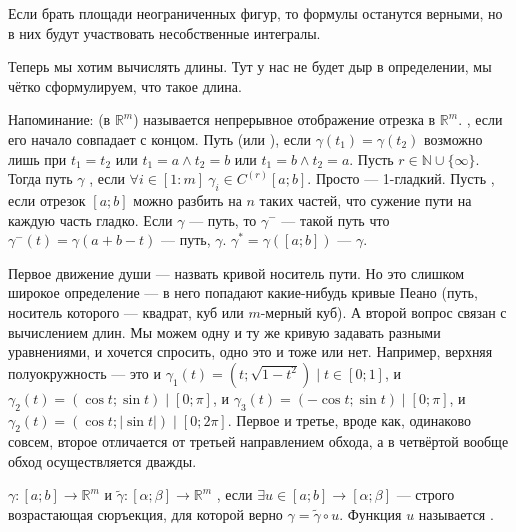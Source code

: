 \documentclass{article}
\begin{document}
\begin{itemize}
\begin{Example}
        \end{Example}
        \begin{Comment}
            Если брать площади неограниченных фигур, то формулы останутся верными, но в них будут участвовать несобственные интегралы.
        \end{Comment}
        \begin{Comment}
            Теперь мы хотим вычислять длины. Тут у нас не будет дыр в определении, мы чётко сформулируем, что такое длина.
        \end{Comment}
        \dfn Напоминание:  (в $\mathbb R^m$) называется непрерывное отображение отрезка в $\mathbb R^m$.
        \dfn {}, если его начало совпадает с концом.
        \dfn Путь  (или ), если $\gamma(t_1)=\gamma(t_2)$ возможно лишь при $t_1=t_2$ или $t_1=a\land t_2=b$ или $t_1=b\land t_2=a$.
        \dfn Пусть $r\in\mathbb N\cup\{\infty\}$. Тогда путь $\gamma$ , если $\forall i\in[1:m]~\gamma_i\in C^{(r)}[a;b]$. Просто  --- 1-гладкий.
        \dfn Пусть , если отрезок $[a;b]$ можно разбить на $n$ таких частей, что сужение пути на каждую часть гладко.
        \dfn Если $\gamma$ --- путь, то $\gamma^-$ --- такой путь что $\gamma^-(t)=\gamma(a+b-t)$ --- путь,  $\gamma$.
        \dfn $\gamma^*=\gamma([a;b])$ ---  $\gamma$.
        \begin{Comment}
            Первое движение души --- назвать кривой носитель пути. Но это слишком широкое определение --- в него попадают какие-нибудь кривые Пеано (путь, носитель которого --- квадрат, куб или $m$-мерный куб). А второй вопрос связан с вычислением длин. Мы можем одну и ту же кривую задавать разными уравнениями, и хочется спросить, одно это и тоже или нет. Например, верхняя полуокружность --- это и $\gamma_1(t)=(t;\sqrt{1-t^2})\mid t\in[0;1]$, и $\gamma_2(t)=(\cos t;\sin t)\mid[0;\pi]$, и $\gamma_3(t)=(-\cos t;\sin t)\mid[0;\pi]$, и $\gamma_2(t)=(\cos t;|\sin t|)\mid[0;2\pi]$. Первое и третье, вроде как, одинаково совсем, второе отличается от третьей направлением обхода, а в четвёртой вообще обход осуществляется дважды.
        \end{Comment}
        \dfn {} $\gamma\colon[a;b]\to\mathbb R^m$ и $\tilde\gamma\colon[\alpha;\beta]\to\mathbb R^m$ , если $\exists u\in[a;b]\to[\alpha;\beta]$ --- строго возрастающая сюръекция, для которой верно $\gamma=\tilde\gamma\circ u$. Функция $u$ называется .

\end{itemize}
\end{document}
